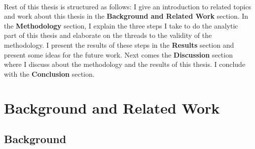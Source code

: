 \documentclass{seal_thesis}
\begin{document}
\\ 
Rest of this thesis is structured as follows: I give an introduction to related topics and work about this thesis in the \textbf{Background and Related Work} section. In the \textbf{Methodology} section, I explain the three steps I take to do the analytic part of this thesis and elaborate on the threads to the validity of the methodology. I present the results of these steps in the \textbf{Results} section and present some ideas for the future work. Next comes the \textbf{Discussion} section where I discuss about the methodology and the results of this thesis. I conclude with the \textbf{Conclusion} section.

\chapter{Background and Related Work}

\section{Background}
\end{document}
